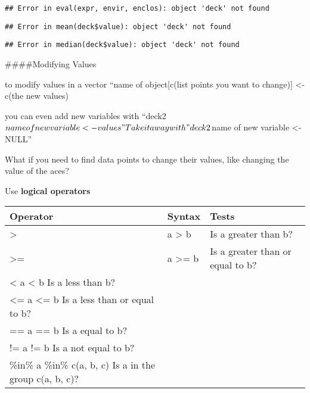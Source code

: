 \documentclass[
]{article}
\newenvironment{Shaded}{\begin{snugshade}}{\end{snugshade}}
\newcommand{\FunctionTok}[1]{\textcolor[rgb]{0.00,0.00,0.00}{#1}}
\newcommand{\NormalTok}[1]{#1}
\newcommand{\SpecialCharTok}[1]{\textcolor[rgb]{0.00,0.00,0.00}{#1}}
\begin{document}
\begin{verbatim}
## Error in eval(expr, envir, enclos): object 'deck' not found
\end{verbatim}

\begin{Shaded}
\end{Shaded}

\begin{verbatim}
## Error in mean(deck$value): object 'deck' not found
\end{verbatim}

\begin{Shaded}
\end{Shaded}

\begin{verbatim}
## Error in median(deck$value): object 'deck' not found
\end{verbatim}

\#\#\#\#Modifying Values

to modify values in a vector ``name of object{[}c(list points you want
to change){]} \textless- c(the new values)

you can even add new variables with
``deck2\(name of new variable <- values" Take it away with "deck2\)name
of new variable \textless- NULL''

What if you need to find data points to change their values, like
changing the value of the aces?

Use \textbf{logical operators}

\begin{longtable}[]{@{}lll@{}}
\toprule
Operator & Syntax & Tests \\
\midrule
\endhead
\textgreater{} & a \textgreater{} b & Is a greater than b? \\
\textgreater= & a \textgreater= b & Is a greater than or equal to b? \\
\textless{} a \textless{} b Is a less than b? & & \\
\textless= a \textless= b Is a less than or equal to b? & & \\
== a == b Is a equal to b? & & \\
!= a != b Is a not equal to b? & & \\
\%in\% a \%in\% c(a, b, c) Is a in the group c(a, b, c)? & & \\
\bottomrule
\end{longtable}
\end{document}
